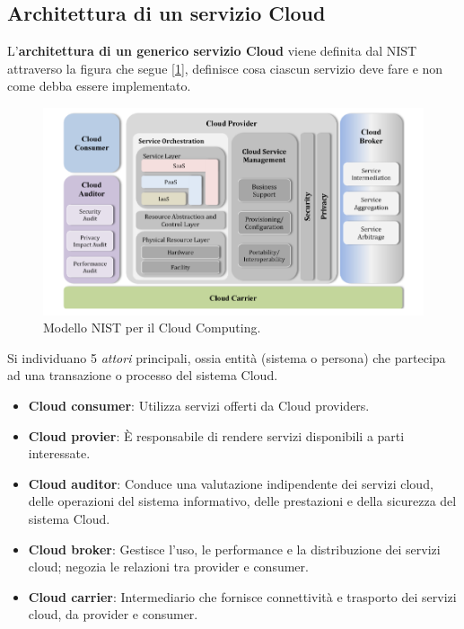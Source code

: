 \subsection{Architettura di un servizio Cloud}
L'\textbf{architettura di un generico servizio Cloud} viene definita dal NIST attraverso la figura che segue [\ref{fig:nist-model}], definisce cosa ciascun servizio deve fare e non come debba essere implementato.
\begin{figure}[!h]
	\centering
	\includegraphics[width=0.55\linewidth]{img/nist-model.png}
	\caption{Modello NIST per il Cloud Computing.}
	\label{fig:nist-model}
\end{figure}
Si individuano 5 \textit{attori} principali, ossia entità (sistema o persona) che partecipa ad una transazione o processo del sistema Cloud.
\begin{itemize}
	\item \textbf{Cloud consumer}: Utilizza servizi offerti da Cloud
	providers.
	\item \textbf{Cloud provier}: \MakeUppercase{è} responsabile di rendere servizi
	disponibili a parti interessate.
	\item \textbf{Cloud auditor}: Conduce una valutazione indipendente
	dei servizi cloud, delle operazioni del sistema
	informativo, delle prestazioni e della sicurezza del
	sistema Cloud.
	\item \textbf{Cloud broker}: Gestisce l'uso, le performance e la
	distribuzione dei servizi cloud; negozia le relazioni tra
	provider e consumer.
	\item \textbf{Cloud carrier}: Intermediario che fornisce connettività e
	trasporto dei servizi cloud, da provider e consumer.
\end{itemize}

